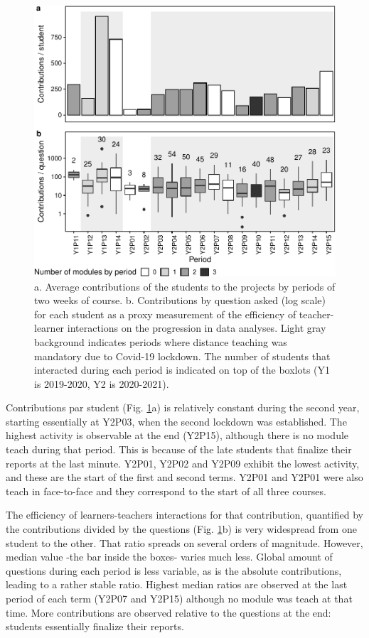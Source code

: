 \documentclass{aims}
\theoremstyle{definition}
\begin{document}
\begin{figure}
\includegraphics[width=1\linewidth]{teaching_data_science_files/figure-latex/fig_support_by_time-1} \caption{\label{fig:fig_support_by_time} a. Average contributions of the students to the projects by periods of two weeks of course. b. Contributions by question asked (log scale) for each student as a proxy measurement of the efficiency of teacher-learner interactions on the progression in data analyses. Light gray background indicates periods where distance teaching was mandatory due to Covid-19 lockdown. The number of students that interacted during each period is indicated on top of the boxlots (Y1 is 2019-2020, Y2 is 2020-2021).}\label{fig:fig_support_by_time}
\end{figure}

Contributions par student (Fig. \ref {fig:fig_support_by_time}a) is
relatively constant during the second year, starting essentially at
Y2P03, when the second lockdown was established. The highest activity is
observable at the end (Y2P15), although there is no module teach during
that period. This is because of the late students that finalize their
reports at the last minute. Y2P01, Y2P02 and Y2P09 exhibit the lowest
activity, and these are the start of the first and second terms. Y2P01
and Y2P01 were also teach in face-to-face and they correspond to the
start of all three courses.

The efficiency of learners-teachers interactions for that contribution,
quantified by the contributions divided by the questions (Fig.
\ref {fig:fig_support_by_time}b) is very widespread from one student to
the other. That ratio spreads on several orders of magnitude. However,
median value -the bar inside the boxes- varies much less. Global amount
of questions during each period is less variable, as is the absolute
contributions, leading to a rather stable ratio. Highest median ratios
are observed at the last period of each term (Y2P07 and Y2P15) although
no module was teach at that time. More contributions are observed
relative to the questions at the end: students essentially finalize
their reports.
\end{document}
